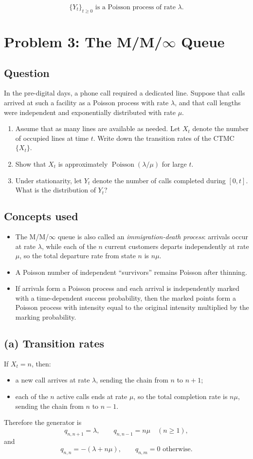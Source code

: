 \documentclass[11pt,a4paper]{article}
\newcommand{\Pois}{\operatorname{Poisson}}
\newcommand{\1}{\mathbf{1}}
\begin{document}
\[
\boxed{\{Y_t\}_{t\ge 0}\text{ is a Poisson process of rate }\lambda.}
\]

\section{Problem 3: The M/M/\texorpdfstring{$\infty$}{infinity} Queue}
\subsection*{Question}
In the pre-digital days, a phone call required a dedicated line. Suppose that calls arrived at such a facility as a Poisson process with rate $\lambda$, and that call lengths were independent and exponentially distributed with rate $\mu$.

\begin{enumerate}[label=\textbf{(\alph*)}]
  \item Assume that as many lines are available as needed. Let $X_t$ denote the number of occupied lines at time $t$. Write down the transition rates of the CTMC $\{X_t\}$.
  \item Show that $X_t$ is approximately $\Pois(\lambda/\mu)$ for large $t$.
  \item Under stationarity, let $Y_t$ denote the number of calls completed during $[0,t]$. What is the distribution of $Y_t$?
\end{enumerate}

\subsection*{Concepts used}
\begin{itemize}
  \item The M/M/$\infty$ queue is also called an \emph{immigration-death process}: arrivals occur at rate $\lambda$, while each of the $n$ current customers departs independently at rate $\mu$, so the total departure rate from state $n$ is $n\mu$.
  \item A Poisson number of independent ``survivors'' remains Poisson after thinning.
  \item If arrivals form a Poisson process and each arrival is independently marked with a time-dependent success probability, then the marked points form a Poisson process with intensity equal to the original intensity multiplied by the marking probability.
\end{itemize}

\subsection*{(a) Transition rates}
If $X_t=n$, then:
\begin{itemize}
  \item a new call arrives at rate $\lambda$, sending the chain from $n$ to $n+1$;
  \item each of the $n$ active calls ends at rate $\mu$, so the total completion rate is $n\mu$, sending the chain from $n$ to $n-1$.
\end{itemize}
Therefore the generator is
\[
q_{n,n+1}=\lambda,\qquad q_{n,n-1}=n\mu\quad (n\ge 1),
\]
and
\[
q_{n,n}=-(\lambda+n\mu),\qquad q_{n,m}=0\text{ otherwise.}
\]
\end{document}
